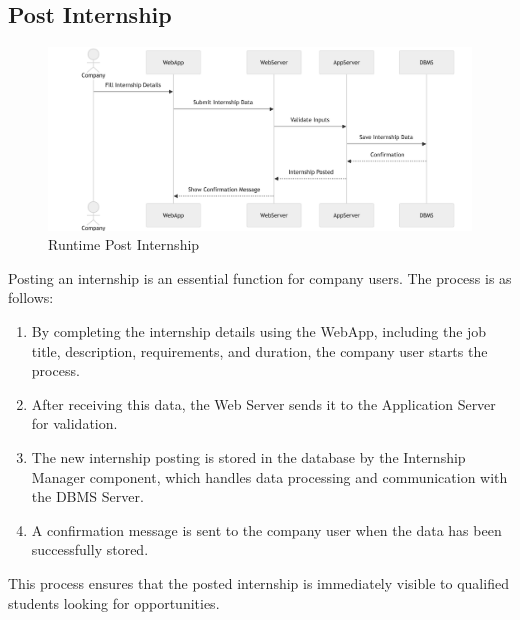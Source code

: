 \subsection{Post Internship}
\label{subsec:post_internship}
\begin{figure}[H]
    \begin{center}
        \includegraphics[width=0.82\linewidth]{JhaBhatiaSharma/imagesDD/PostInternshipRuntime.png}
        \caption{Runtime Post Internship}
        \label{fig:postinternshpruntime}%
    \end{center}
\end{figure}
Posting an internship is an essential function for company users. The process is as follows:
\begin{enumerate}
    \item By completing the internship details using the WebApp, including the job title, description, requirements, and duration, the company user starts the process.
    \item After receiving this data, the Web Server sends it to the Application Server for validation.
    \item The new internship posting is stored in the database by the Internship Manager component, which handles data processing and communication with the DBMS Server.
    \item A confirmation message is sent to the company user when the data has been successfully stored.
\end{enumerate}
This process ensures that the posted internship is immediately visible to qualified students looking for opportunities.

